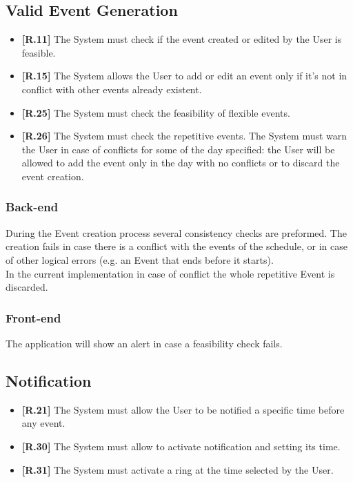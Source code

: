 \subsection{Valid Event Generation}
\begin{itemize}
\item {\color{OliveGreen}\textbf{[R.11]}} The System must check if the event created or edited by the User is feasible.
\item {\color{OliveGreen}\textbf{[R.15]}} The System allows the User to add or edit an event only if it’s not in conflict with other events already existent.
\item {\color{OliveGreen}\textbf{[R.25]}} The System must check the feasibility of flexible events.
\item {\color{Red}\textbf{[R.26]}} The System must check the repetitive events. The System must warn the User in case of conflicts for some of the day specified: the User will be allowed to add the event only in the day with no conflicts or to discard the event creation.
\end{itemize}

\subsubsection*{Back-end}
During the Event creation process several consistency checks are preformed.
The creation fails in case there is a conflict with the events of the schedule, or in case of other logical errors (e.g. an Event that ends before it starts).\\
In the current implementation in case of conflict the whole repetitive Event is discarded.

\subsubsection*{Front-end}
The application will show an alert in case a feasibility check fails.

\subsection{Notification}
\begin{itemize}
\item {\color{red}\textbf{[R.21]}} The System must allow the User to be notified a specific time before any event.
\item {\color{red}\textbf{[R.30]}} The System must allow to activate notification and setting its time. 
\item {\color{red}\textbf{[R.31]}} The System must activate a ring at the time selected by the User.
\end{itemize}


